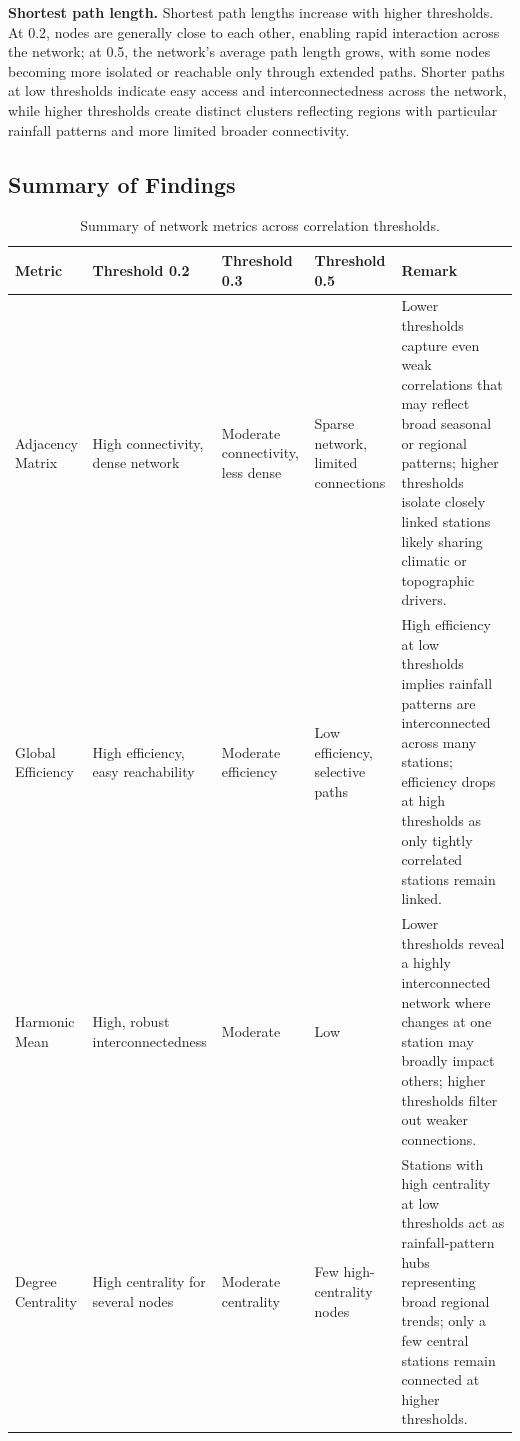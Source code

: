 \documentclass[11pt]{article}
\begin{document}
\textbf{Shortest path length.} Shortest path lengths increase with higher thresholds. At 0.2, nodes
are generally close to each other, enabling rapid interaction across the network; at 0.5, the
network's average path length grows, with some nodes becoming more isolated or reachable only through
extended paths. Shorter paths at low thresholds indicate easy access and interconnectedness across the
network, while higher thresholds create distinct clusters reflecting regions with particular rainfall
patterns and more limited broader connectivity.

\subsection{Summary of Findings}

\begin{table}[H]
  \centering
  \small
  \caption{Summary of network metrics across correlation thresholds.}
  \label{tab:summary}
  \begin{tabular}{@{}p{2.3cm}p{2.3cm}p{2.3cm}p{2.3cm}p{4.0cm}@{}}
    \toprule
    \textbf{Metric} & \textbf{Threshold 0.2} & \textbf{Threshold 0.3} & \textbf{Threshold 0.5} & \textbf{Remark} \\
    \midrule
    Adjacency Matrix & High connectivity, dense network & Moderate connectivity, less dense & Sparse network, limited connections &
    Lower thresholds capture even weak correlations that may reflect broad seasonal or regional patterns; higher thresholds isolate closely linked stations likely sharing climatic or topographic drivers. \\
    \addlinespace
    Global Efficiency & High efficiency, easy reachability & Moderate efficiency & Low efficiency, selective paths &
    High efficiency at low thresholds implies rainfall patterns are interconnected across many stations; efficiency drops at high thresholds as only tightly correlated stations remain linked. \\
    \addlinespace
    Harmonic Mean & High, robust interconnectedness & Moderate & Low &
    Lower thresholds reveal a highly interconnected network where changes at one station may broadly impact others; higher thresholds filter out weaker connections. \\
    \addlinespace
    Degree Centrality & High centrality for several nodes & Moderate centrality & Few high-centrality nodes &
    Stations with high centrality at low thresholds act as rainfall-pattern hubs representing broad regional trends; only a few central stations remain connected at higher thresholds. \\

\end{tabular}
\end{table}
\end{document}
